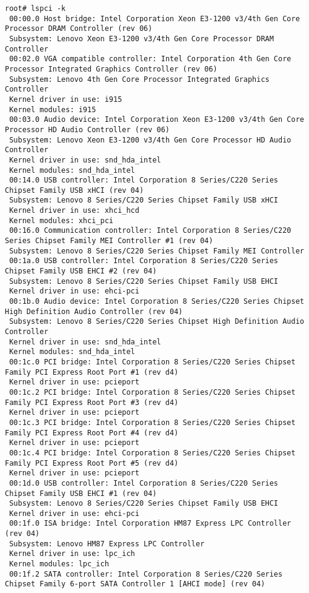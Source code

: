 \documentclass[10pt,a4paper]{article}
\begin{document}
                \begin{lstlisting}[style=BashInputRoot]
 root# lspci -k
 00:00.0 Host bridge: Intel Corporation Xeon E3-1200 v3/4th Gen Core Processor DRAM Controller (rev 06)
 Subsystem: Lenovo Xeon E3-1200 v3/4th Gen Core Processor DRAM Controller
 00:02.0 VGA compatible controller: Intel Corporation 4th Gen Core Processor Integrated Graphics Controller (rev 06)
 Subsystem: Lenovo 4th Gen Core Processor Integrated Graphics Controller
 Kernel driver in use: i915
 Kernel modules: i915
 00:03.0 Audio device: Intel Corporation Xeon E3-1200 v3/4th Gen Core Processor HD Audio Controller (rev 06)
 Subsystem: Lenovo Xeon E3-1200 v3/4th Gen Core Processor HD Audio Controller
 Kernel driver in use: snd_hda_intel
 Kernel modules: snd_hda_intel
 00:14.0 USB controller: Intel Corporation 8 Series/C220 Series Chipset Family USB xHCI (rev 04)
 Subsystem: Lenovo 8 Series/C220 Series Chipset Family USB xHCI
 Kernel driver in use: xhci_hcd
 Kernel modules: xhci_pci
 00:16.0 Communication controller: Intel Corporation 8 Series/C220 Series Chipset Family MEI Controller #1 (rev 04)
 Subsystem: Lenovo 8 Series/C220 Series Chipset Family MEI Controller
 00:1a.0 USB controller: Intel Corporation 8 Series/C220 Series Chipset Family USB EHCI #2 (rev 04)
 Subsystem: Lenovo 8 Series/C220 Series Chipset Family USB EHCI
 Kernel driver in use: ehci-pci
 00:1b.0 Audio device: Intel Corporation 8 Series/C220 Series Chipset High Definition Audio Controller (rev 04)
 Subsystem: Lenovo 8 Series/C220 Series Chipset High Definition Audio Controller
 Kernel driver in use: snd_hda_intel
 Kernel modules: snd_hda_intel
 00:1c.0 PCI bridge: Intel Corporation 8 Series/C220 Series Chipset Family PCI Express Root Port #1 (rev d4)
 Kernel driver in use: pcieport
 00:1c.2 PCI bridge: Intel Corporation 8 Series/C220 Series Chipset Family PCI Express Root Port #3 (rev d4)
 Kernel driver in use: pcieport
 00:1c.3 PCI bridge: Intel Corporation 8 Series/C220 Series Chipset Family PCI Express Root Port #4 (rev d4)
 Kernel driver in use: pcieport
 00:1c.4 PCI bridge: Intel Corporation 8 Series/C220 Series Chipset Family PCI Express Root Port #5 (rev d4)
 Kernel driver in use: pcieport
 00:1d.0 USB controller: Intel Corporation 8 Series/C220 Series Chipset Family USB EHCI #1 (rev 04)
 Subsystem: Lenovo 8 Series/C220 Series Chipset Family USB EHCI
 Kernel driver in use: ehci-pci
 00:1f.0 ISA bridge: Intel Corporation HM87 Express LPC Controller (rev 04)
 Subsystem: Lenovo HM87 Express LPC Controller
 Kernel driver in use: lpc_ich
 Kernel modules: lpc_ich
 00:1f.2 SATA controller: Intel Corporation 8 Series/C220 Series Chipset Family 6-port SATA Controller 1 [AHCI mode] (rev 04)

\end{lstlisting}
\end{document}
